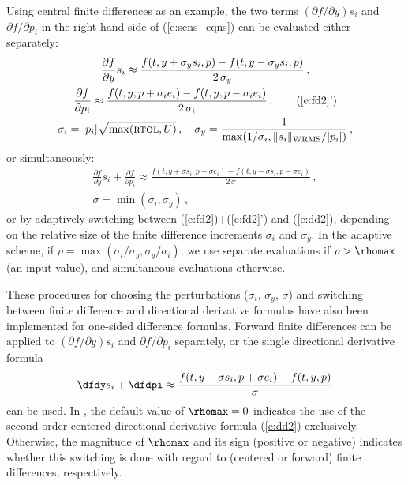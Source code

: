 Using central finite differences as an example, the two terms 
$({\partial f}/{\partial y}) s_i$ 
and ${\partial f}/{\partial p_i}$ in the right-hand side of (\ref{e:sens_eqns}) 
can be evaluated either separately:
\begin{gather}
  \frac{\partial f}{\partial y} s_i \approx \frac{f(t, y+\sigma_y s_i, p)-
    f(t, y-\sigma_y s_i, p)}{2\,\sigma_y} \, , \label{e:fd2} \\
  \frac{\partial f}{\partial p_i} \approx \frac{f(t,y,p + \sigma_i e_i)-
    f(t,y,p - \sigma_i e_i)}{2\,\sigma_i} \, , \tag{\ref{e:fd2}'} \\
  \sigma_i = |{\bar p}_i| \sqrt{\max( \mbox{\sc rtol} , U)} \, , \quad
  \sigma_y = \frac{1}{\max(1/\sigma_i, \|s_i\|_{\mbox{\scriptsize WRMS}}/|{\bar p}_i|)} \, , \nonumber
\end{gather}
or simultaneously:
\begin{gather}
  \frac{\partial f}{\partial y} s_i + \frac{\partial f}{\partial p_i} \approx
  \frac{f(t, y+\sigma s_i, p + \sigma e_i) -
    f(t, y-\sigma s_i, p - \sigma e_i)}{2\,\sigma} \, , \label{e:dd2} \\
  \sigma = \min(\sigma_i, \sigma_y) \, , \nonumber
\end{gather}
or by adaptively switching between (\ref{e:fd2})+(\ref{e:fd2}') and (\ref{e:dd2}), 
depending on the relative size of the finite difference increments
$\sigma_i$ and $\sigma_y$.  In the adaptive scheme, if
$\rho = \max(\sigma_i/\sigma_y,\sigma_y/\sigma_i)$, we use separate
evaluations if $\rho > \rhomax$ (an input value), and simultaneous
evaluations otherwise.

These procedures for choosing the perturbations ($\sigma_i$, $\sigma_y$, $\sigma$)
and switching between finite difference and directional derivative
formulas have also been implemented for one-sided difference formulas.
Forward finite differences can be applied to $({\partial f}/{\partial y}) s_i$
and ${\partial f}/{\partial p_i}$ separately, or the single directional
derivative formula
\begin{equation*}
\dfdy s_i + \dfdpi \approx
\frac{f(t, y+\sigma s_i, p + \sigma e_i) - f(t, y, p)}{\sigma}
\end{equation*}
can be used.
In {\cvodes}, the default value of $\rhomax=0$ indicates the use of
the second-order centered directional derivative formula (\ref{e:dd2}) exclusively.
Otherwise, the magnitude of $\rhomax$ and its sign (positive or
negative) indicates whether this switching is done with regard to
(centered or forward) finite differences, respectively.


